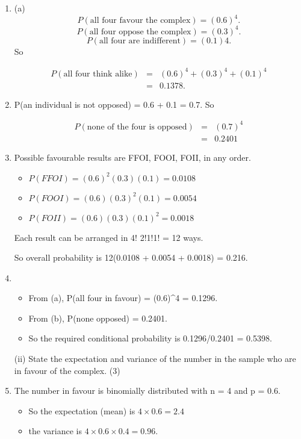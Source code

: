 \documentclass[a4paper,12pt]{article}
\begin{document}
\begin{enumerate}

\item (a)
\[P(\mbox{all four favour the complex}) = (0.6)^4.\]
\[P(\mbox{all four oppose the complex}) = (0.3)^4.\]
\[P(\mbox{all four are indifferent}) = (0.1)4.\]
So 

\begin{eqnarray*}
P(\mbox{all four think alike}) 
&=& (0.6)^4 + (0.3)^4 + (0.1)^4 \\ &=& 0.1378.
\end{eqnarray*}


\item  P(an individual is not opposed) = 0.6 + 0.1 = 0.7.
So 

\begin{eqnarray*}
P(\mbox{none of the four is opposed}) &=& (0.7)^4\\ &=& 0.2401
\end{eqnarray*}


\item  Possible favourable results are FFOI, FOOI, FOII, in any order.
\begin{itemize}
\item $P(FFOI) = (0.6)^2(0.3)(0.1) = 0.0108$
\item $P(FOOI) = (0.6)(0.3)^2(0.1) = 0.0054$
\item $P(FOII) = (0.6)(0.3)(0.1)^2 = 0.0018$
\end{itemize}

Each result can be arranged in 4!
2!1!1!
= 12 ways.

So overall probability is 12(0.0108 + 0.0054 + 0.0018) = 0.216.
\item \begin{itemize}
    \item From (a), P(all four in favour) = (0.6)^4 = 0.1296.
    \item From (b), P(none
opposed) = 0.2401. 
\item So the required conditional probability is
0.1296/0.2401 = 0.5398.
\end{itemize} 

\begin{framed}
(ii) State the expectation and variance of the number in the sample who are in favour of the complex. (3) 
\end{framed}
\item The number in favour is binomially distributed with n = 4 and p = 0.6. 
\begin{itemize}
    \item So the
expectation (mean) is $4 \times 0.6 = 2.4$ 
\item the variance is $4 \times 0.6 \times 0.4 = 0.96$.
\end{itemize}


\end{enumerate}
\end{document}
